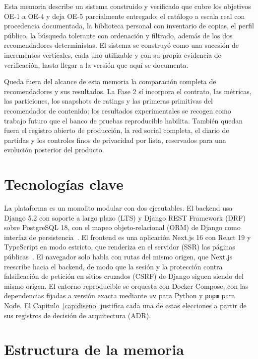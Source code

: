 Esta memoria describe un sistema construido y verificado que cubre los objetivos OE-1 a
OE-4 y deja OE-5 parcialmente entregado: el catálogo a escala real con procedencia documentada, la biblioteca personal con
inventario de copias, el perfil público, la búsqueda tolerante con ordenación y filtrado,
además de los dos recomendadores deterministas. El sistema se construyó como una sucesión de
incrementos verticales, cada uno utilizable y con su propia evidencia de verificación, hasta
llegar a la versión que aquí se documenta.

Queda fuera del alcance de esta memoria la comparación completa de recomendadores y sus
resultados. La Fase 2 sí incorpora el contrato, las métricas, las particiones, los snapshots
de ratings y las primeras primitivas del recomendador de contenido; los resultados
experimentales se recogen como trabajo futuro que el banco de pruebas reproducible habilita.
También quedan
fuera el registro abierto de producción, la red social completa, el diario de partidas y los
controles finos de privacidad por lista, reservados para una evolución posterior del
producto.

\section{Tecnologías clave}\label{sec:intro-tecnologias}

La plataforma es un monolito modular con dos ejecutables. El backend usa Django 5.2 con soporte
a largo plazo (LTS) y Django REST Framework (DRF) sobre PostgreSQL 18, con el mapeo
objeto-relacional (ORM) de Django como interfaz de persistencia~\cite{django,drf,postgresql}. El frontend es una
aplicación Next.js 16 con React 19 y TypeScript en modo estricto, que renderiza en el
servidor (SSR) las páginas públicas~\cite{nextjs,react}. El navegador solo habla con rutas del mismo origen, que
Next.js reescribe hacia el backend, de modo que la sesión y la protección contra
falsificación de petición en sitios cruzados (CSRF) de Django siguen siendo del mismo origen.
El entorno reproducible se orquesta con Docker Compose, con las dependencias fijadas a
versión exacta mediante \texttt{uv} para Python y \texttt{pnpm} para Node. El
Capítulo~\ref{cap:diseno} justifica cada una de estas elecciones a partir de sus registros
de decisión de arquitectura (ADR).

\section{Estructura de la memoria}\label{sec:intro-estructura}

